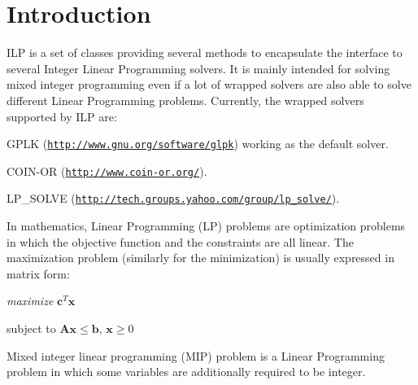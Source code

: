 \hypertarget{src_ilp_page_ILP_INTRO}{}\section{Introduction}\label{src_ilp_page_ILP_INTRO}
I\+LP is a set of classes providing several methods to encapsulate the interface to several Integer Linear Programming solvers. It is mainly intended for solving mixed integer programming even if a lot of wrapped solvers are also able to solve different Linear Programming problems. Currently, the wrapped solvers supported by I\+LP are\+:
\begin{DoxyItemize}
\item G\+P\+LK (\href{http://www.gnu.org/software/glpk}{\tt http\+://www.\+gnu.\+org/software/glpk}) working as the default solver.
\item C\+O\+I\+N-\/\+OR (\href{http://www.coin-or.org/}{\tt http\+://www.\+coin-\/or.\+org/}).
\item L\+P\+\_\+\+S\+O\+L\+VE (\href{http://tech.groups.yahoo.com/group/lp_solve/}{\tt http\+://tech.\+groups.\+yahoo.\+com/group/lp\+\_\+solve/}).
\end{DoxyItemize}

In mathematics, Linear Programming (LP) problems are optimization problems in which the objective function and the constraints are all linear. The maximization problem (similarly for the minimization) is usually expressed in matrix form\+:

{\itshape maximize} $ \mathbf{c}^T \mathbf{x} $

subject to $ \mathbf{A}\mathbf{x} \le \mathbf{b}, \, \mathbf{x} \ge 0 $

Mixed integer linear programming (M\+IP) problem is a Linear Programming problem in which some variables are additionally required to be integer.

